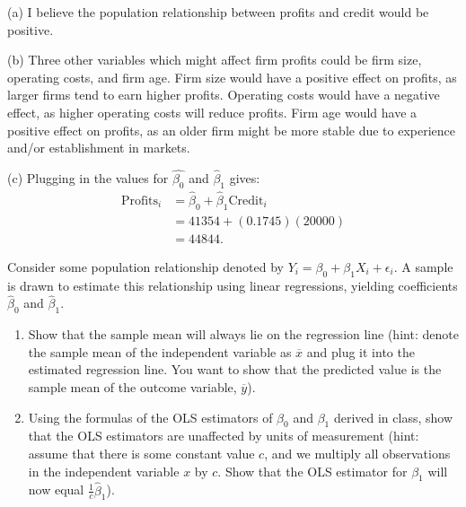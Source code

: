 \documentclass[11pt,twoside,openany]{memoir}
\begin{document}
        \begin{answer}
            (a) I believe the population relationship between profits and credit would be positive. 

            (b) Three other variables which might affect firm profits could be firm size, operating costs, and firm age. Firm size would have a positive effect on profits, as larger firms tend to earn higher profits. Operating costs would have a negative effect, as higher operating costs will reduce profits. Firm age would have a positive effect on profits, as an older firm might be more stable due to experience and/or establishment in markets.

            (c) Plugging in the values for $\hat{\beta_0}$ and $\hat{\beta}_1$ gives:
                \begin{equation*}
                \begin{split}
                    \text{Profits}_i &= \hat{\beta}_0 + \hat{\beta}_1 \text{Credit}_i \\
                    & = 41354 + (0.1745)(20000) \\
                    & = 44844.
                \end{split}
                \end{equation*}
        \end{answer}
    \begin{question}
        Consider some population relationship denoted by $Y_i = \beta_0 + \beta_1 X_i + \epsilon_i$. A sample is drawn to estimate this relationship using linear regressions, yielding coefficients $\hat{\beta}_0$ and $\hat{\beta}_1$.
            \begin{enumerate}[label = (\alph*),itemsep=1pt,topsep=3pt]
                \item Show that the sample mean will always lie on the regression line (hint: denote the sample mean of the independent variable as $\overline{x}$ and plug it into the estimated regression line. You want to show that the predicted value is the sample mean of the outcome variable, $\overline{y}$).
                \item Using the formulas of the OLS estimators of $\beta_0$ and $\beta_1$ derived in class, show that the OLS estimators are unaffected by units of measurement (hint: assume that there is some constant value $c$, and we multiply all observations in the independent variable $x$ by $c$. Show that the OLS estimator for $\beta_1$ will now equal $\frac{1}{c}\hat{\beta}_1$).
            \end{enumerate}
    \end{question}
\end{document}
